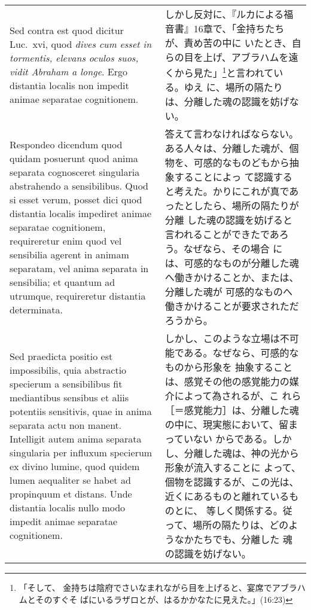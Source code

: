 \documentclass[10pt]{jsarticle} %
\begin{document}
\begin{longtable}{p{21em}p{21em}}
\\



{\sc Sed contra est} quod dicitur Luc.~{\sc xvi}, quod
 {\it dives cum esset in tormentis, elevans oculos suos, vidit Abraham a
 longe}. Ergo distantia localis non impedit animae separatae cognitionem.

& しかし反対に、『ルカによる福音書』16章で、「金持ちたちが、責め苦の中に
いたとき、自らの目を上げ、アブラハムを遠くから見た」\footnote{「そして、
金持ちは陰府でさいなまれながら目を上げると、宴席でアブラハムとそのすぐそ
ばにいるラザロとが、はるかかなたに見えた。」(16:23)}と言われている。ゆえ
に、場所の隔たりは、分離した魂の認識を妨げない。

\\



{\sc Respondeo dicendum} quod quidam posuerunt quod
 anima separata cognosceret singularia abstrahendo a sensibilibus. Quod
 si esset verum, posset dici quod distantia localis impediret animae
 separatae cognitionem, requireretur enim quod vel sensibilia agerent in
 animam separatam, vel anima separata in sensibilia; et quantum ad
 utrumque, requireretur distantia determinata. 


&
答えて言わなければならない。
ある人々は、分離した魂が、個物を、可感的なものどもから抽象することによっ
 て認識すると考えた。かりにこれが真であったとしたら、場所の隔たりが分離
 した魂の認識を妨げると言われることができたであろう。なぜなら、その場合
 には、可感的なものが分離した魂へ働きかけることか、または、分離した魂が
 可感的なものへ働きかけることが要求されただろうから。


\\
Sed praedicta positio est
 impossibilis, quia abstractio specierum a sensibilibus fit mediantibus
 sensibus et aliis potentiis sensitivis, quae in anima separata actu non
 manent. Intelligit autem anima separata singularia per influxum
 specierum ex divino lumine, quod quidem lumen aequaliter se habet ad
 propinquum et distans. Unde distantia localis nullo modo impedit animae
 separatae cognitionem.

&
しかし、このような立場は不可能である。なぜなら、可感的なものから形象を
 抽象することは、感覚その他の感覚能力の媒介によって為されるが、こ
 れら［＝感覚能力］は、分離した魂の中に、現実態において、留まっていない
 からである。しかし、分離した魂は、神の光から形象が流入することに
 よって、個物を認識するが、この光は、近くにあるものと離れているものとに、
 等しく関係する。従って、場所の隔たりは、どのようなかたちでも、分離した
 魂の認識を妨げない。


\end{longtable}
\end{document}
